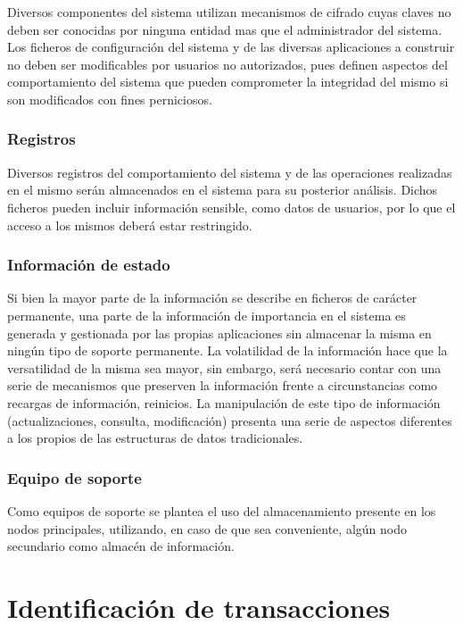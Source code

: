 Diversos componentes del sistema utilizan mecanismos de cifrado cuyas claves no deben ser conocidas por ninguna entidad mas que el administrador del sistema. Los ficheros de configuración del sistema y de las diversas aplicaciones a construir no deben ser modificables por usuarios no autorizados, pues definen aspectos del comportamiento del sistema que pueden comprometer la integridad del mismo si son modificados con fines perniciosos.

\subsubsection{Registros}

Diversos registros del comportamiento del sistema y de las operaciones realizadas en el mismo serán almacenados en el sistema para su posterior análisis. Dichos ficheros pueden incluir información sensible, como datos de usuarios, por lo que el acceso a los mismos deberá estar restringido.

\subsubsection{Información de estado}

Si bien la mayor parte de la información se describe en ficheros de carácter permanente, una parte de la información de importancia en el sistema es generada y gestionada por las propias aplicaciones sin almacenar la misma en ningún tipo de soporte permanente. La volatilidad de la información hace que la versatilidad de la misma sea mayor, sin embargo, será necesario contar con una serie de mecanismos que preserven la información frente a circunstancias como recargas de información, reinicios. La manipulación de este tipo de información (actualizaciones, consulta, modificación) presenta una serie de aspectos diferentes a los propios de las estructuras de datos tradicionales.

\subsubsection{Equipo de soporte}

Como equipos de soporte se plantea el uso del almacenamiento presente en los nodos principales, utilizando, en caso de que sea conveniente, algún nodo secundario como almacén de información.

\section{Identificación de transacciones}

